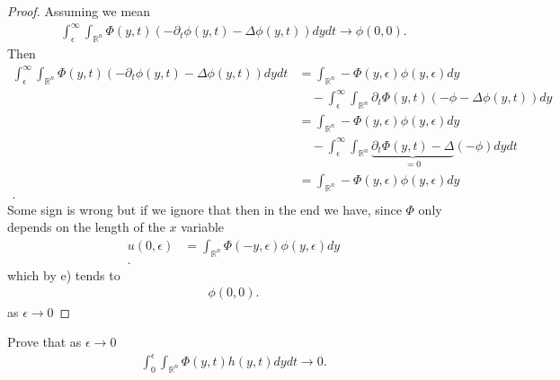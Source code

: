   \begin{proof}
   Assuming we mean 
   \begin{align*}
     \int_{\epsilon}^{\infty} \int_{\mathbb{R}^{n} }\Phi(y,t)(-\partial_t \phi(y,t)  - \Delta \phi(y,t) )dydt \to \phi(0,0)
   .\end{align*}
   Then 
   \begin{align*}
     \int_{\epsilon}^{\infty} \int_{\mathbb{R}^{n} }\Phi(y,t)(-\partial_t \phi(y,t)  - \Delta \phi(y,t) )dydt &= \int_{\mathbb{R}^{n} }-\Phi(y,\epsilon)\phi(y,\epsilon) dy  \\
                                                                                                              &  \quad -\int_{\epsilon}^{\infty}\int_{\mathbb{R}^{n} }  \partial_t \Phi(y,t) (-\phi - \Delta \phi(y,t) )dy\\
                                                                                                              &=\int_{\mathbb{R}^{n} }-\Phi(y,\epsilon)\phi(y,\epsilon) dy  \\
                                                                                                              & \quad  -\int_{\epsilon}^{\infty}\int_{\mathbb{R}^{n} }  \underbrace{\partial_t \Phi(y,t)-\Delta}_{=0} (-\phi)dy dt\\
                                                                                                              &= \int_{\mathbb{R}^{n} }-\Phi(y,\epsilon)\phi(y,\epsilon) dy  \\
   .\end{align*}
   Some sign is wrong but if we ignore that then in the end we have, since $\Phi $ only depends on the length of the $x$ variable
   \begin{align*}
     u(0,\epsilon) &= \int_{\mathbb{R}^{n} }\Phi(-y,\epsilon)\phi(y,\epsilon) dy  \\
   .\end{align*}
   which by e) tends to
   \begin{align*}
    \phi(0,0)
   .\end{align*}
   as $\epsilon\to 0$
  \end{proof}
  \begin{exercise}[g]
   Prove that as $\epsilon \to 0$  
   \begin{align*}
     \int_0^{\epsilon} \int_{\mathbb{R}^{n} } \Phi(y,t)h(y,t) dy dt \to 0
   .\end{align*}
  \end{exercise}
